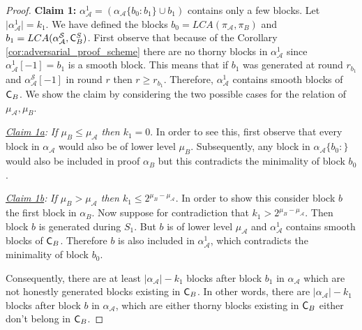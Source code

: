 \begin{proof}
\textbf{Claim 1:} $\alpha_\mathcal{A}^1 = (\alpha_\mathcal{A}\{b_0 : b_1\} \cup b_1)$ contains only a few blocks. Let $\lvert \alpha^1_\mathcal{A} \rvert = k_1$. We have defined the blocks $b_0 = LCA(\pi_\mathcal{A}, \pi_B)$ and $b_1 = LCA(\alpha^{\mathcal{S}}_\mathcal{A}, \mathsf{C}^S_B)$. First observe that because of the Corollary \ref{cor:adversarial_proof_scheme} there are no thorny blocks in $\alpha_\mathcal{A}^1$ since $\alpha_\mathcal{A}^1[-1] = b_1$ is a smooth block. This means that if $b_1$ was generated at round $r_{b_1}$ and $\alpha^{\mathcal{S}}_\mathcal{A}[-1]$ in round $r$ then $r \geq r_{b_1}$. Therefore, $\alpha_\mathcal{A}^1$ contains smooth blocks of $\mathsf{C}_B$. We show the claim by considering the two possible cases for the relation of $\mu_\mathcal{A}, \mu_B$.

\textit{\underline{Claim 1a}:} \textit{If $\mu_B \leq \mu_\mathcal{A}$ then $k_1 = 0$}. In order to see this, first observe that every block in $\alpha_\mathcal{A}$ would also be of lower level $\mu_B$. Subsequently, any block in $\alpha_\mathcal{\mathcal{A}}\{b_0{:}\}$ would also be included in proof $\alpha_B$ but this contradicts the minimality of block $b_0$.

\textit{\underline{Claim 1b}:} \textit{If $\mu_B > \mu_\mathcal{A}$ then $k_1 \leq 2^{\mu_B - \mu_\mathcal{A}}$}. In order to show this consider block $b$ the first block in $\alpha_B$. Now suppose for contradiction that $k_1 > 2^{\mu_B - \mu_\mathcal{A}}$. Then block $b$ is generated during $S_1$. But $b$ is of lower level $\mu_\mathcal{A}$ and $\alpha^1_\mathcal{A}$ contains smooth blocks of $\mathsf{C}_B$. Therefore $b$ is also included in $\alpha^1_\mathcal{A}$, which contradicts the minimality of block $b_0$.


Consequently, there are at least $\lvert\alpha_\mathcal{A}\rvert - k_1$ blocks after block $b_1$ in $\alpha_\mathcal{A}$ which are not honestly generated blocks existing in $\mathsf{C}_B$. In other words, there are $\vert \alpha_\mathcal{A} \vert - k_1$ blocks after block $b$ in $\alpha_\mathcal{A}$, which are either thorny blocks existing in $\mathsf{C}_B$ either don't belong in $\mathsf{C}_B$.


\end{proof}
